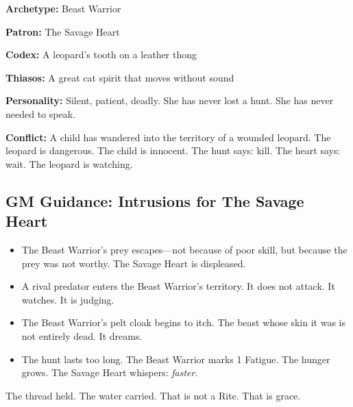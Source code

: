 \textbf{Archetype:} Beast Warrior

\textbf{Patron:} The Savage Heart

\textbf{Codex:} A leopard's tooth on a leather thong

\textbf{Thiasos:} A great cat spirit that moves without sound

\textbf{Personality:} Silent, patient, deadly. She has never lost a hunt. She has never needed to speak.

\textbf{Conflict:} A child has wandered into the territory of a wounded leopard. The leopard is dangerous. The child is innocent. The hunt says: kill. The heart says: wait. The leopard is watching.

\subsection{GM Guidance: Intrusions for The Savage Heart}

\begin{itemize}
\item The Beast Warrior's prey escapes—not because of poor skill, but because the prey was not worthy. The Savage Heart is displeased.
\item A rival predator enters the Beast Warrior's territory. It does not attack. It watches. It is judging.
\item The Beast Warrior's pelt cloak begins to itch. The beast whose skin it was is not entirely dead. It dreams.
\item The hunt lasts too long. The Beast Warrior marks 1 Fatigue. The hunger grows. The Savage Heart whispers: \textit{faster}.
\end{itemize}

The thread held. The water carried. That is not a Rite. That is grace.
